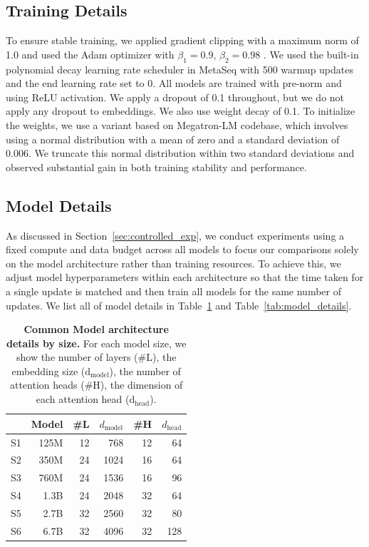 \documentclass{article}
\theoremstyle{plain}
\theoremstyle{definition}
\theoremstyle{remark}
\begin{document}
\subsection{Training Details}
\label{subsec:append_training}
    To ensure stable training, we applied gradient clipping with a maximum norm of 1.0 and used the Adam optimizer with $\beta_1 = 0.9$, $\beta_2 = 0.98$ \cite{ADAM}. We used the built-in polynomial decay learning rate scheduler in MetaSeq with 500 warmup updates and the end learning rate set to 0. All models are trained with pre-norm and using ReLU activation. We apply a dropout of 0.1 throughout, but we do not apply any dropout to embeddings. We also use weight decay of 0.1. To initialize the weights, we use a variant based on Megatron-LM codebase, which involves using a normal distribution with a mean of zero and a standard deviation of 0.006. We truncate this normal distribution within two standard deviations and observed substantial gain in both training stability and performance.

\subsection{Model Details}
\label{subsec:apend_modl}

As discussed in Section~\ref{sec:controlled_exp}, we conduct experiments using a fixed compute and data budget across all models to focus our comparisons solely on the model architecture rather than training resources. To achieve this, we adjust model hyperparameters within each architecture so that the time taken for a single update is matched and then train all models for the same number of updates. We list all of model details in Table~\ref{table:opt_model_desc} and Table~\ref{tab:model_details}. 

\begin{table}[h]
\centering
\begin{tabular}{lrrrrr}
\toprule
{} & Model & \#L & $d_{\text{model}}$ & \#H & $d_{\text{head}}$  \\ \midrule
S1 & 125M  & 12  & 768  & 12  & 64     \\
S2 & 350M  & 24  & 1024 & 16  & 64         \\
S3 & 760M  & 24  & 1536 & 16  & 96       \\
S4 & 1.3B  & 24  & 2048 & 32  & 64       \\
S5 & 2.7B  & 32  & 2560 & 32  & 80       \\
S6 & 6.7B  & 32  & 4096 & 32  & 128      \\
\bottomrule
\end{tabular}
\caption{\textbf{Common Model architecture details by size.} For each model size, we show the number of layers (\#L), the embedding size ($\text{d}_\text{model}$), the number of attention heads (\#H), the dimension of each attention head ($\text{d}_\text{head}$).}
\label{table:opt_model_desc}
\end{table}
\end{document}
